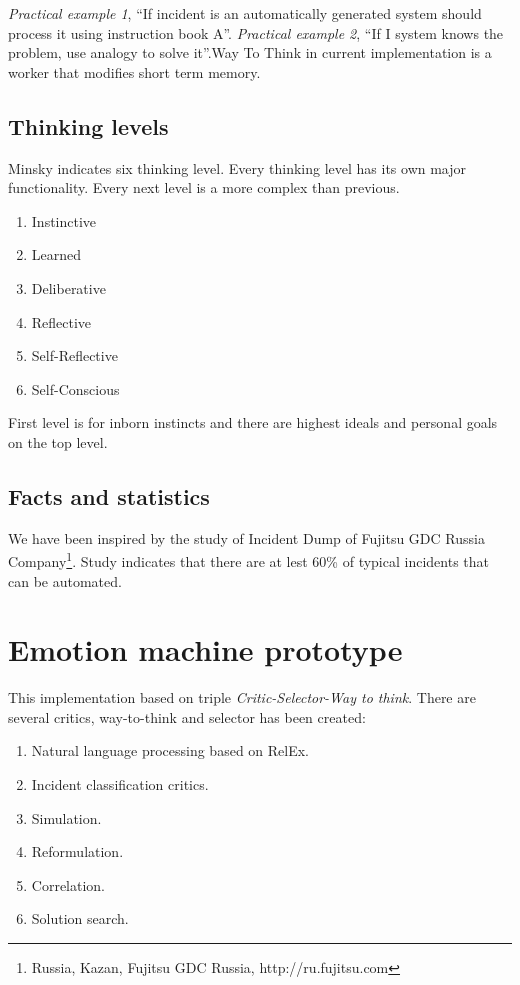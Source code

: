 \documentclass[runningheads,a4paper]{llncs}
\begin{document}
\emph{Practical example 1}, “If incident is an automatically generated system should process it using instruction book A”.
\emph{Practical example 2}, “If I system knows the problem, use analogy to solve it”.Way To Think in current implementation is a worker that modifies short term memory.

\subsection{Thinking levels}

Minsky indicates six thinking level. Every thinking level has its own major functionality. Every next level is a more complex than previous.

\begin{enumerate}
 \item Instinctive
 \item Learned
 \item Deliberative
 \item Reflective
 \item Self-Reflective
 \item Self-Conscious
\end{enumerate}
First level is for inborn instincts and there are highest ideals and personal goals on the top level.

\subsection{Facts and statistics}
We have been inspired by the study of Incident Dump of Fujitsu GDC Russia  Company\footnote{Russia, Kazan, Fujitsu GDC Russia, http://ru.fujitsu.com}. Study indicates that there are at lest 60\% of typical incidents that can be automated.

\section{Emotion machine prototype}
This implementation based on triple \emph{Critic-Selector-Way to think}. There are several critics, way-to-think and selector has been created:

\begin{enumerate}
 \item Natural language processing based on RelEx.
 \item Incident classification critics.
 \item Simulation.
 \item Reformulation.
 \item Correlation.
 \item Solution search.
\end{enumerate}
\end{document}

